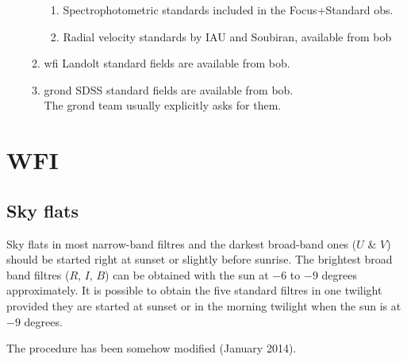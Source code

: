 \documentclass[11pt,fleqn]{book}
\newcounter{procedure}[chapter]
\begin{document}
\begin{enumerate}
\begin{enumerate}
        \begin{enumerate}
            \item Spectrophotometric standards included in the Focus+Standard \gls{ob}s.
            \item Radial velocity standards by IAU and Soubiran, available from \gls{bob}
        \end{enumerate}
        \item \gls{wfi} Landolt standard fields are available from \gls{bob}.
        \item \gls{grond} SDSS standard fields are available from \gls{bob}.\\
            The \gls{grond} team usually explicitly asks for them.    
    \end{enumerate}
\end{enumerate}

\section{WFI}


\subsection{Sky flats}
\label{sec:wfiflats}
Sky flats in most narrow-band filtres and the darkest broad-band ones ($U$ \& $V$) should be started right at sunset or slightly before sunrise.  The brightest
broad band filtres ($R$, $I$, $B$) can be obtained with the sun at $-6$ to
$-9$ degrees approximately.  It is possible to obtain the five standard filtres in one twilight provided they are started at sunset or in the morning twilight when the sun is at $-9$ degrees.

The procedure has been somehow modified (January 2014).  
\end{document}
